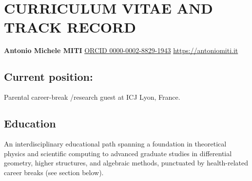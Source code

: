 \documentclass[a4paper,fontsize=11bp]{scrartcl}
\DeclareRobustCommand{\ERCauthor}[1]{{\color{black}#1}}
\DeclareRobustCommand{\ERCrevision}[1]{{\color{ERCRevisionRed}#1}}
\newenvironment{refsection}{\begingroup}{\endgroup}
\begin{document}
\section*{CURRICULUM VITAE AND TRACK RECORD}
\label{sc:cv}
\begin{refsection}




\noindent
\textbf{Antonio Michele MITI}
\hfill 
\ERCauthor{\href{https://orcid.org/0000-0002-8829-1943}{ORCID 0000-0002-8829-1943}}
\hfill  
\ERCauthor{\url{https://antoniomiti.it}}\hfill

\par
\subsection*{Current position:}
  Parental career-break \quad/\quad research guest at ICJ Lyon, France.


\subsection*{Education}

\noindent
An interdisciplinary educational path spanning a foundation in theoretical physics and scientific computing to advanced graduate studies in differential geometry, higher structures, and algebraic methods, punctuated by health-related career breaks (see section below).
\par


\end{refsection}
\end{document}
